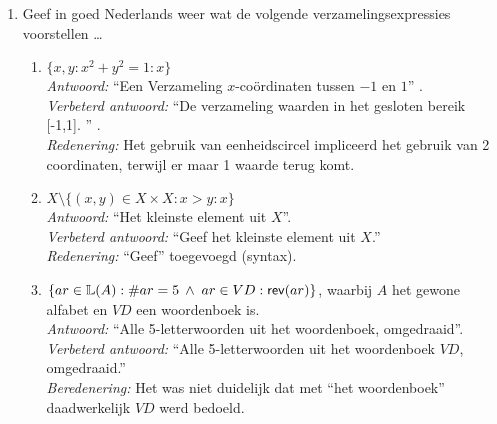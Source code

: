 
\begin{enumerate}

\item Geef in goed Nederlands weer wat  de volgende verzamelingsexpressies voorstellen \ldots
\begin{enumerate}

    \item $\{x,y : x^2 + y^2 =1 : x\}$ \\
        \emph{Antwoord:} ``Een Verzameling $x$-co\"{o}rdinaten tussen $-1$ en $1$'' .\\
        \emph{Verbeterd antwoord:} ``De verzameling waarden in het gesloten bereik [-1,1]. '' .\\
        \emph{Redenering:} Het gebruik van eenheidscircel impliceerd het gebruik van 2 coordinaten, terwijl er maar 1 waarde terug
        komt. \\

    \item $X\setminus \{(x,y)\in X\times X : x > y : x\}$ \\
        \emph{Antwoord:} ``Het kleinste element uit $X$''.\\
        \emph{Verbeterd antwoord:} ``Geef het kleinste element uit $X$.'' \\
        \emph{Redenering:} ``Geef'' toegevoegd (syntax). \\

    \item $\{ar \in \mathbb{L}(A): \#ar = 5 \:\land\; ar\in VD : \mbox{\textsf{rev}}(ar)\}$, waarbij $A$ het gewone alfabet en $VD$ een woordenboek is.\\
        \emph{Antwoord:} ``Alle 5-letterwoorden uit het woordenboek, omgedraaid''. \\
        \emph{Verbeterd antwoord:} ``Alle 5-letterwoorden uit het woordenboek $VD$, omgedraaid.'' \\
        \emph{Beredenering:} Het was niet duidelijk dat met ``het woordenboek'' daadwerkelijk $VD$ werd bedoeld. \\



\end{enumerate}
\end{enumerate}
